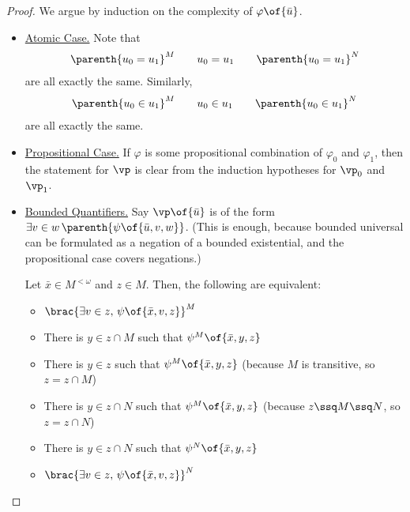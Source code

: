 \begin{proof}
    We argue by induction on the complexity of $\varphi\of{\bar{u}}$.

    \begin{itemize}
        \item \underline{Atomic Case.} Note that
        \begin{align*}
            \parenth{u_0 = u_1}^M
            \qquad
            u_0 = u_1
            \qquad
            \parenth{u_0 = u_1}^N
        \end{align*}
        are all exactly the same. Similarly,
        \begin{align*}
            \parenth{u_0 \in u_1}^M
            \qquad
            u_0 \in u_1
            \qquad
            \parenth{u_0 \in u_1}^N
        \end{align*}
        are all exactly the same.

        \item \underline{Propositional Case.} If $\varphi$ is some propositional combination of $\varphi_0$ and $\varphi_1$, then the statement for $\vp$ is clear from the induction hypotheses for $\vp_0$ and $\vp_1$.

        \item \underline{Bounded Quantifiers.} Say $\vp\of{\bar{u}}$ is of the form $\exists v \in w \, \parenth{\psi\of{\bar{u}, v, w}}$. (This is enough, because bounded universal can be formulated as a negation of a bounded existential, and the propositional case covers negations.)

        Let $\bar{x} \in M^{<\omega}$ and $z \in M$. Then, the following are equivalent:
        \begin{itemize}
            \item $\brac{\exists v \in z, \, \psi\of{\bar{x}, v, z}}^M$
            \item There is $y \in z \cap M$ such that $\psi^M\of{\bar{x}, y, z}$
            \item There is $y \in z$ such that $\psi^M\of{\bar{x}, y, z}$ (because $M$ is transitive, so $z = z \cap M$)
            \item There is $y \in z \cap N$ such that $\psi^M\of{\bar{x}, y, z}$ (because $z \ssq M \ssq N$, so $z = z \cap N$)
            \item There is $y \in z \cap N$ such that $\psi^N\of{\bar{x}, y, z}$
            \item $\brac{\exists v \in z, \, \psi\of{\bar{x}, v, z}}^N$
        \end{itemize}
    \end{itemize}
\end{proof}

